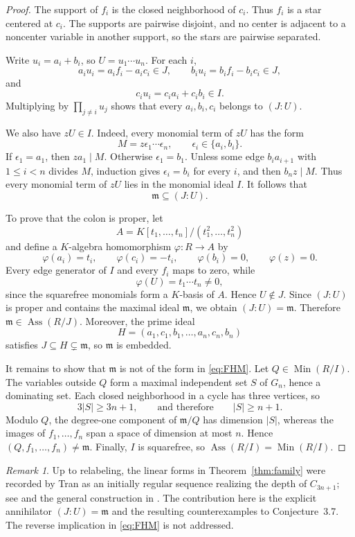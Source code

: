 \documentclass[11pt]{amsart}
\theoremstyle{remark}
\newtheorem{remark}[theorem]{Remark}
\DeclareMathOperator{\Ass}{Ass}
\DeclareMathOperator{\Min}{Min}
\begin{document}
\begin{proof}
The support of $f_i$ is the closed neighborhood of $c_i$.
Thus $f_i$ is a star centered at $c_i$. The supports are pairwise
disjoint, and no center is adjacent to a noncenter variable in
another support, so the stars are pairwise separated.

Write $u_i=a_i+b_i$, so $U=u_1\cdots u_n$. For each $i$,
\[
 a_i u_i=a_i f_i-a_i c_i\in J,\qquad
 b_i u_i=b_i f_i-b_i c_i\in J,
\]
and
\[
 c_i u_i=c_i a_i+c_i b_i\in I.
\]
Multiplying by $\prod_{j\neq i}u_j$ shows that every
$a_i,b_i,c_i$ belongs to $(J:U)$.

We also have $zU\in I$. Indeed, every monomial term of $zU$ has
the form
\[
 M=z\epsilon_1\cdots\epsilon_n,
 \qquad \epsilon_i\in\{a_i,b_i\}.
\]
If $\epsilon_1=a_1$, then $za_1\mid M$. Otherwise
$\epsilon_1=b_1$. Unless some edge $b_i a_{i+1}$ with
$1\leq i<n$ divides $M$, induction gives $\epsilon_i=b_i$ for
every $i$, and then $b_nz\mid M$.
Thus every monomial term of $zU$ lies in the monomial ideal $I$.
It follows that
\[
 \mathfrak m\subseteq(J:U).
\]

To prove that the colon is proper, let
\[
 A=K[t_1,\ldots,t_n]/(t_1^2,\ldots,t_n^2)
\]
and define a $K$-algebra homomorphism $\varphi:R\to A$ by
\[
 \varphi(a_i)=t_i,\qquad
 \varphi(c_i)=-t_i,\qquad
 \varphi(b_i)=0,\qquad
 \varphi(z)=0.
\]
Every edge generator of $I$ and every $f_i$ maps to zero, while
\[
 \varphi(U)=t_1\cdots t_n\neq0,
\]
since the squarefree monomials form a $K$-basis of $A$. Hence
$U\notin J$. Since $(J:U)$ is proper and contains the
maximal ideal $\mathfrak m$, we obtain $(J:U)=\mathfrak m$.
Therefore $\mathfrak m\in\Ass(R/J)$. Moreover, the prime ideal
\[
 H=(a_1,c_1,b_1,\ldots,a_n,c_n,b_n)
\]
satisfies $J\subseteq H\subsetneq\mathfrak m$, so
$\mathfrak m$ is embedded.

It remains to show that $\mathfrak m$ is not of the form in
\eqref{eq:FHM}. Let $Q\in\Min(R/I)$. The variables outside $Q$
form a maximal independent set $S$ of $G_n$, hence a dominating
set. Each closed neighborhood in a cycle has three vertices, so
\[
 3|S|\geq 3n+1,
 \qquad\text{and therefore}\qquad |S|\geq n+1.
\]
Modulo $Q$, the degree-one component of $\mathfrak m/Q$ has
dimension $|S|$, whereas the images of $f_1,\ldots,f_n$ span a
space of dimension at most $n$. Hence
$(Q,f_1,\ldots,f_n)\neq\mathfrak m$. Finally, $I$ is squarefree,
so $\Ass(R/I)=\Min(R/I)$.
\end{proof}

\begin{remark}\label{rem:provenance}
Up to relabeling, the linear forms in Theorem~\ref{thm:family}
were recorded by Tran as an initially regular sequence realizing
the depth of $C_{3n+1}$; see \cite[Remark~3.2]{Tran} and the
general construction in \cite[Theorem~3.11]{FHM20}. The contribution
here is the explicit annihilator $(J:U)=\mathfrak m$ and the
resulting counterexamples to Conjecture~3.7. The reverse implication
in \eqref{eq:FHM} is not addressed.
\end{remark}
\end{document}

